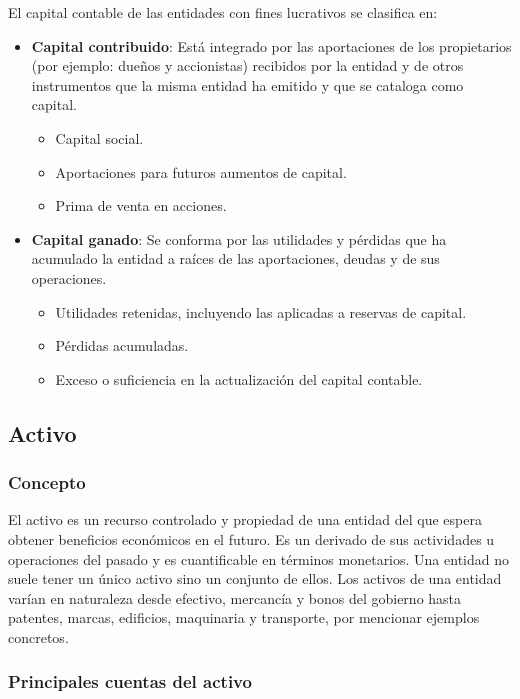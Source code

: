 \documentclass[12pt]{article}
\begin{document}
		El capital contable de las entidades con fines lucrativos se clasifica en:
		\begin{itemize}
			\item \textbf{Capital contribuido}: Está integrado por las aportaciones de los propietarios (por ejemplo: dueños y accionistas) recibidos por la entidad y de otros instrumentos que la misma entidad ha emitido y que se cataloga como capital.
				\begin{itemize}
					\item Capital social.
					\item Aportaciones para futuros aumentos de capital.
					\item Prima de venta en acciones.
				\end{itemize}
			\item \textbf{Capital ganado}: Se conforma por las utilidades y pérdidas que ha acumulado la entidad a raíces de las aportaciones, deudas y de sus operaciones.
				\begin{itemize}
					\item Utilidades retenidas, incluyendo las aplicadas a reservas de capital.
					\item Pérdidas acumuladas.
					\item Exceso o suficiencia en la actualización del capital contable.
				\end{itemize}
		\end{itemize}

	\subsection{Activo}

		\subsubsection{Concepto}

		El activo es un recurso controlado y propiedad de una entidad del que espera obtener beneficios económicos en el futuro. Es un derivado de sus actividades u operaciones del pasado y es cuantificable en términos monetarios. Una entidad no suele tener un único activo sino un conjunto de ellos. Los activos de una entidad varían en naturaleza desde efectivo, mercancía y bonos del gobierno hasta patentes, marcas, edificios, maquinaria y transporte, por mencionar ejemplos concretos.

		\subsubsection{Principales cuentas del activo}
\end{document}
